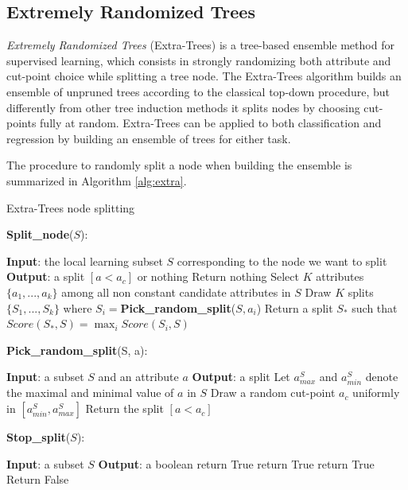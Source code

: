  
\subsection{Extremely Randomized Trees}
\textit{Extremely Randomized Trees} (Extra-Trees) \cite{geurts2006extremely}
is a tree-based ensemble method for supervised learning, which consists in 
strongly randomizing both attribute and cut-point choice while splitting a tree 
node. 
The Extra-Trees algorithm builds an ensemble of unpruned trees according to the 
classical top-down procedure, but differently from other tree induction methods
it splits nodes by choosing cut-points fully at random. 
Extra-Trees can be applied to both classification and regression by building 
an ensemble of trees for either task.

The procedure to randomly split a node when building the ensemble is summarized 
in Algorithm \ref{alg:extra}.
%
\begin{algorithm}[h]
\caption{Extra-Trees node splitting}
\label{alg:extra}
\begin{algorithmic}
    \STATE \textbf{Split\_node}($S$):
	\begin{ALC@g}
	\STATE \textbf{Input}: the local learning subset $S$ corresponding to the node we want to split
	\STATE \textbf{Output}: a split $[a < a_c]$ or nothing
	    \STATE Return nothing
	\ELSE{} 
	    \STATE Select $K$ attributes $\{a_1, ..., a_k\}$ among all non constant candidate attributes in $S$
	    \STATE Draw $K$ splits $\{S_1, ..., S_k\}$ where $S_i=$\textbf{Pick\_random\_split}($S, a_i$)
	    \STATE Return a split $S_*$ such that $Score(S_*, S)=\max_{i}Score(S_i, S)$
	\ENDIF
	\end{ALC@g}
    \STATE
    \STATE \textbf{Pick\_random\_split}(S, a):
	\begin{ALC@g}
	\STATE \textbf{Input}: a subset $S$ and an attribute $a$
	\STATE \textbf{Output}: a split
	\STATE Let $a_{max}^S$ and $a_{min}^S$ denote the maximal and minimal value of $a$ in $S$
	\STATE Draw a random cut-point $a_c$ uniformly in $[a_{min}^S, a_{max}^S]$
	\STATE Return the split $[a < a_c]$
	\end{ALC@g}
    \STATE
    \STATE \textbf{Stop\_split}($S$):
	\begin{ALC@g}
	\STATE \textbf{Input}: a subset $S$
	\STATE \textbf{Output}: a boolean
	 \STATE return True \ENDIF
	 \STATE return True \ENDIF
	 \STATE return True \ENDIF
	\STATE Return False
	\end{ALC@g}
\end{algorithmic}
\end{algorithm}
%

